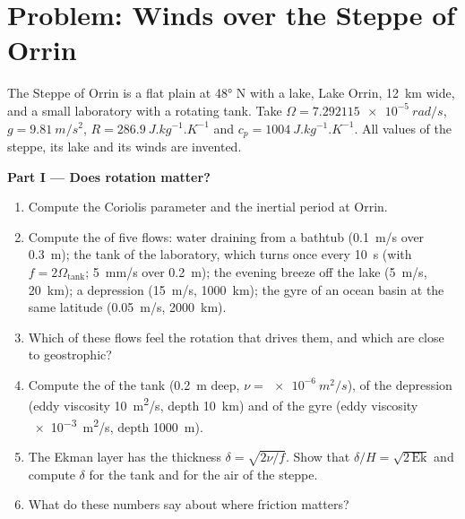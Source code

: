\section{Problem: Winds over the Steppe of Orrin}

\begin{problem}
\label{pb:b3:gfd-foundations:1}
The Steppe of Orrin is a flat plain at \ang{48} N with a lake, Lake Orrin,
\qty{12}{km} wide, and a small laboratory with a rotating tank. Take
$\Omega = \qty{7.292115e-5}{rad/s}$, $g = \qty{9.81}{m/s^2}$, $R =
\qty{286.9}{J.kg^{-1}.K^{-1}}$ and $c_p = \qty{1004}{J.kg^{-1}.K^{-1}}$.
All values of the steppe, its lake and its winds are invented.

\medskip\noindent\textbf{Part I --- Does rotation matter?}
\begin{enumerate}
\item Compute the Coriolis parameter and the inertial period at Orrin.
\item Compute the  of five flows: water draining from a bathtub
  (\qty{0.1}{m/s} over \qty{0.3}{m}); the tank of the laboratory, which turns
  once every \qty{10}{s} (with $f = 2\Omega_{\text{tank}}$; \qty{5}{mm/s}
  over \qty{0.2}{m}); the evening breeze off the lake (\qty{5}{m/s},
  \qty{20}{km}); a depression (\qty{15}{m/s}, \qty{1000}{km}); the gyre of an
  ocean basin at the same latitude (\qty{0.05}{m/s}, \qty{2000}{km}).
\item Which of these flows feel the rotation that drives them, and which are
  close to geostrophic?
\item Compute the  of the tank (\qty{0.2}{m} deep, $\nu =
  \qty{e-6}{m^2/s}$), of the depression (eddy viscosity \qty{10}{m^2/s},
  depth \qty{10}{km}) and of the gyre (eddy viscosity \qty{e-3}{m^2/s},
  depth \qty{1000}{m}).
\item The Ekman layer has the thickness $\delta = \sqrt{2\nu/f}$. Show that
  $\delta/H = \sqrt{2\,\mathrm{Ek}}$ and compute $\delta$ for the tank and for
  the air of the steppe.
\item What do these numbers say about where friction matters?
\end{enumerate}


\end{problem}
